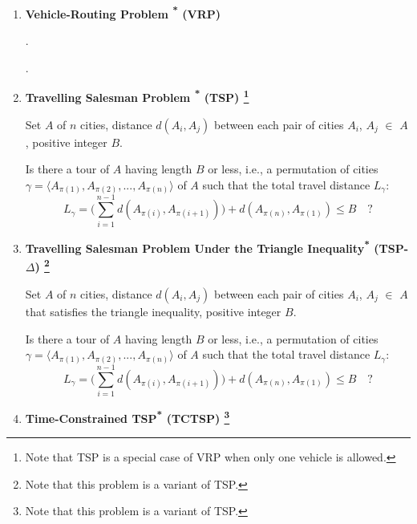 \documentclass{mprop}
\theoremstyle{definition}
\begin{document}
\begin{enumerate}

\item \textbf{Vehicle-Routing Problem \textsuperscript{*} (VRP)}
\begin{instance}
.
\end{instance}
\begin{question}
.
\end{question}

\item \textbf{Travelling Salesman Problem \textsuperscript{*} (TSP) \footnote{Note that TSP is a special case of VRP when only one vehicle is allowed.}}
\begin{instance}
Set $A$ of $n$ cities, distance $d(A_{i}, A_{j})$ between each pair of cities $A_{i}$, $A_{j}$ $\in$ $A$, positive integer $B$.
\end{instance}

\begin{question}
Is there a tour of $A$ having length $B$ or less, i.e., a permutation of cities $\gamma = \langle A_{\pi(1)}, A_{\pi(2)},...,A_{\pi(n)} \rangle $ of $A$ such that the total travel distance $L_{\gamma}$:
$$L_{\gamma} = \bigg( \sum_{i=1}^{n-1} d(A_{\pi(i)}, A_{\pi(i+1)}) \bigg) + d(A_{\pi(n)}, A_{\pi(1)}) \leq B \quad \textrm{?}$$
\end{question}

\item \textbf{Travelling Salesman Problem Under the Triangle Inequality\textsuperscript{*} (TSP-$\Delta$) \footnote{Note that this problem is a variant of TSP.}}
\begin{instance}
Set $A$ of $n$ cities, distance $d(A_{i}, A_{j})$ between each pair of cities $A_{i}$, $A_{j}$ $\in$ $A$ that satisfies the triangle inequality, positive integer $B$.
\end{instance}

\begin{question}
Is there a tour of $A$ having length $B$ or less, i.e., a permutation of cities $\gamma = \langle A_{\pi(1)}, A_{\pi(2)},...,A_{\pi(n)} \rangle $ of $A$ such that the total travel distance $L_{\gamma}$:
$$L_{\gamma} = \bigg( \sum_{i=1}^{n-1} d(A_{\pi(i)}, A_{\pi(i+1)}) \bigg) + d(A_{\pi(n)}, A_{\pi(1)}) \leq B \quad \textrm{?}$$
\end{question}

\item \textbf{Time-Constrained TSP\textsuperscript{*} (TCTSP) \footnote{Note that this problem is a variant of TSP.}}


\end{enumerate}
\end{document}
